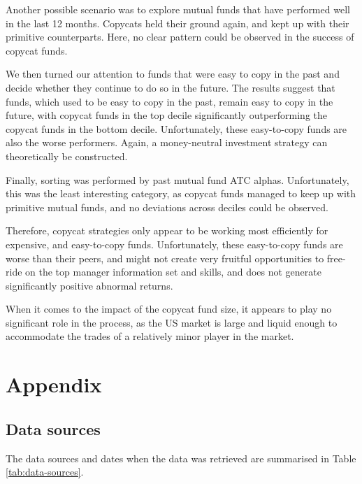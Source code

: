 \documentclass[12pt, a4]{article}
\begin{document}
Another possible scenario was to explore mutual funds that have performed well in the last 12 months. Copycats held their ground again, and kept up with their primitive counterparts. Here, no clear pattern could be observed in the success of copycat funds.

We then turned our attention to funds that were easy to copy in the past and decide whether they continue to do so in the future. The results suggest that funds, which used to be easy to copy in the past, remain easy to copy in the future, with copycat funds in the top decile significantly outperforming the copycat funds in the bottom decile. Unfortunately, these easy-to-copy funds are also the worse performers. Again, a money-neutral investment strategy can theoretically be constructed.

Finally, sorting was performed by past mutual fund \textsc{ATC} alphas. Unfortunately, this was the least interesting category, as copycat funds managed to keep up with primitive mutual funds, and no deviations across deciles could be observed.

Therefore, copycat strategies only appear to be working most efficiently for expensive, and easy-to-copy funds. Unfortunately, these easy-to-copy funds are worse than their peers, and might not create very fruitful opportunities to free-ride on the top manager information set and skills, and does not generate significantly positive abnormal returns. 

When it comes to the impact of the copycat fund size, it appears to play no significant role in the process, as the \textsc{US} market is large and liquid enough to accommodate the trades of a relatively minor player in the market.

\clearpage






\clearpage
\section*{Appendix}\label{sec:appendices}

\subsection*{Data sources}\label{sec:data-sources}
The data sources and dates when the data was retrieved are summarised in Table \ref{tab:data-sources}.
\end{document}
